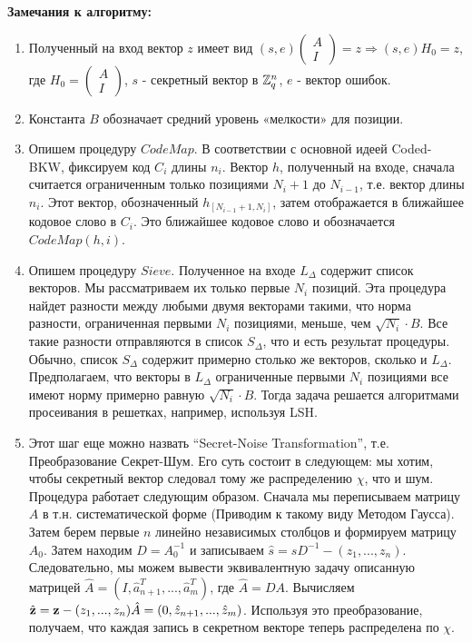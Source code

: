 \documentclass[a4paper,11pt]{article}
\begin{document}
\textbf{Замечания к алгоритму:}\\
\begin{enumerate}
\item Полученный на вход вектор $z$ имеет вид $(s,e)\begin{pmatrix} A\\ I \end{pmatrix} = z \Rightarrow (s,e)H_0 = z$, где $H_0 = \begin{pmatrix} A\\ I \end{pmatrix}$, $s$ - секретный вектор в ${{\mathbb Z}}^{n}_q$, $e$ - вектор ошибок.
\item Константа $B$ обозначает средний уровень «мелкости» для позиции.
\item Опишем процедуру $CodeMap$. В соответствии с основной идеей Coded-BKW, фиксируем код $C_i$ длины $n_i$. Вектор $h$, полученный на входе, сначала считается ограниченным только позициями $N_i+1$ до $N_{i-1}$, т.е. вектор длины $n_i$. Этот вектор, обозначенный $h_{[N_{i-1}+1,N_i]}$, затем отображается в ближайшее кодовое слово в $C_i$. Это ближайшее кодовое слово и обозначается $CodeMap(h,i)$.
\item Опишем процедуру $Sieve$. Полученное на входе $L_{\Delta}$ содержит список векторов. Мы рассматриваем их только первые $N_i$ позиций. Эта процедура найдет разности между любыми двумя векторами такими, что норма разности, ограниченная первыми $N_i$ позициями, меньше, чем $\sqrt{N_i}\cdot B$. Все такие разности отправляются в список $S_{\Delta}$, что и есть результат процедуры. Обычно, список $S_{\Delta}$ содержит примерно столько же векторов, сколько и $L_{\Delta}$. Предполагаем, что векторы в $L_{\Delta}$ ограниченные первыми $N_i$ позициями все имеют норму примерно равную $\sqrt{N_i}\cdot B$. Тогда задача решается алгоритмами просеивания в решетках, например, используя LSH.
\item Этот шаг еще можно назвать “Secret-Noise Transformation”, т.е. Преобразование Секрет-Шум. Его суть состоит в следующем: мы хотим, чтобы секретный вектор следовал тому же распределению $\chi$, что и шум. Процедура работает следующим образом. Сначала мы переписываем матрицу $A$ в т.н. систематической форме (Приводим к такому виду Методом Гаусса). Затем берем первые $n$ линейно независимых столбцов и формируем матрицу $A_0$. Затем находим $D = A_0^{-1}$ и записываем $\hat{s} = sD^{-1} - (z_1,...,z_n)$. Следовательно, мы можем вывести эквивалентную задачу описанную матрицей $\hat{A} = (I, \hat{a}^T_{n+1},..., \hat{a}^T_{m})$, где $\hat{A}=DA$. Вычисляем $\hat{\mathbf{z}} = \mathbf{z} - (z_1,...,z_n)\hat{A} = (0, \hat{z}_{n+1},..., \hat{z}_{m})$. Используя это преобразование, получаем, что каждая запись в секретном векторе теперь распределена по $\chi$.

\end{enumerate}
\end{document}
